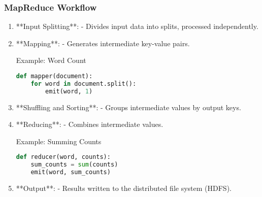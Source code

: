 \documentclass[aspectratio=169]{beamer}
\begin{document}
\begin{frame}[fragile]
    \frametitle{MapReduce Workflow}
    \begin{enumerate}
        \item **Input Splitting**: 
          - Divides input data into splits, processed independently.
        \item **Mapping**: 
          - Generates intermediate key-value pairs.
          \begin{block}{Example: Word Count}
          \begin{lstlisting}[language=Python]
def mapper(document):
    for word in document.split():
        emit(word, 1)
          \end{lstlisting}
          \end{block}
        \item **Shuffling and Sorting**: 
          - Groups intermediate values by output keys.
        \item **Reducing**: 
          - Combines intermediate values.
          \begin{block}{Example: Summing Counts}
          \begin{lstlisting}[language=Python]
def reducer(word, counts):
    sum_counts = sum(counts)
    emit(word, sum_counts)
          \end{lstlisting}
          \end{block}
        \item **Output**: 
          - Results written to the distributed file system (HDFS).
    \end{enumerate}
\end{frame}
\end{document}
